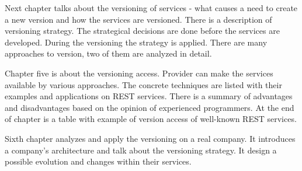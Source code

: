Next chapter talks about the versioning of services - what causes a need to create a new version and how the services are versioned. There is a description of versioning strategy. The strategical decisions are done before the services are developed. During the versioning the strategy is applied. There are many approaches to version, two of them are analyzed in detail.

Chapter five is about the versioning access. Provider can make the services available by various approaches. The concrete techniques are listed with their examples and applications on REST services. There is a summary of advantages and disadvantages based on the opinion of experienced programmers. At the end of chapter is a table with example of version access of well-known REST services.

Sixth chapter analyzes and apply the versioning on a real company. It introduces a company's architecture and talk about the versioning strategy. It design a possible evolution and changes within their services.



